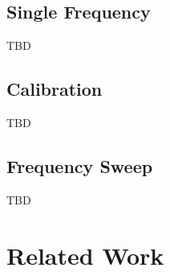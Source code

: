\documentclass[]{IEEEtran}
\begin{document}
\subsection{Single Frequency}
TBD
\subsection{Calibration}
TBD
\subsection{Frequency Sweep}
TBD


\section {Related Work}






%
%

\end{document}
